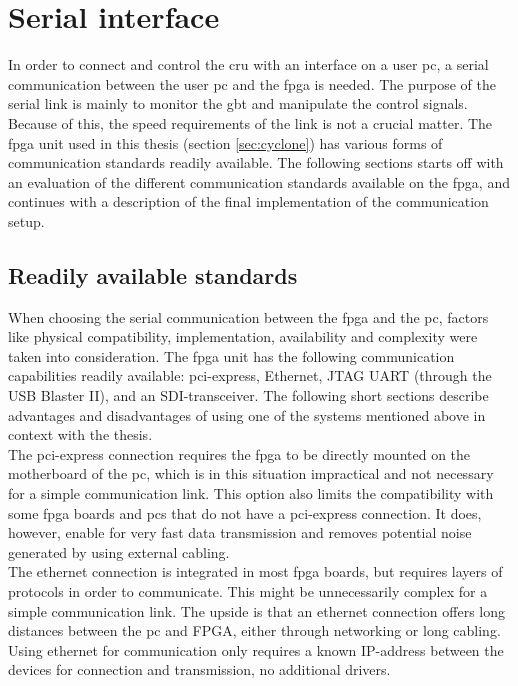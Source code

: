 \documentclass[main.tex]{subfiles}
\begin{document}
\chapter{Serial interface}

In order to connect and control the \gls{cru} with an interface on a user \gls{pc}, a serial communication between the user \gls{pc} and the \gls{fpga} is needed. The purpose of the serial link is mainly to monitor the \gls{gbt} and manipulate the control signals. Because of this, the speed requirements of the link is not a crucial matter. The \gls{fpga} unit used in this thesis (section \ref{sec:cyclone}) has various forms of communication standards readily available. The following sections starts off with an evaluation of the different communication standards available on the \gls{fpga}, and continues with a description of the final implementation of the communication setup.
\\

\section{Readily available standards}
When choosing the serial communication between the \gls{fpga} and the \gls{pc}, factors like physical compatibility, implementation, availability and complexity were taken into consideration. The \gls{fpga} unit has the following communication capabilities readily available: \gls{pci}-express, Ethernet, JTAG UART (through the USB Blaster II), and an SDI-transceiver. The following short sections describe advantages and disadvantages of using one of the systems mentioned above in context with the thesis.\\

The \gls{pci}-express connection requires the \gls{fpga} to be directly mounted on the motherboard of the \gls{pc}, which is in this situation impractical and not necessary for a simple communication link. This option also limits the compatibility with some \gls{fpga} boards and \gls{pc}s that do not have a \gls{pci}-express connection. It does, however, enable for very fast data transmission and removes potential noise generated by using external cabling. \\

The ethernet connection is integrated in most \gls{fpga} boards, but requires layers of protocols in order to communicate. This might be unnecessarily complex for a simple communication link. The upside is that an ethernet connection offers long distances between the \gls{pc} and FPGA, either through networking or long cabling. Using ethernet for communication only requires a known IP-address between the devices for connection and transmission, no additional drivers. \\
\end{document}
